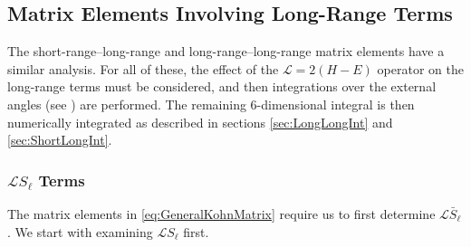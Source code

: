 \documentclass[Dissertation.tex]{subfiles}
\begin{document}
\subsection{Matrix Elements Involving Long-Range Terms}
\label{sec:MatrixLong}
The short-range--long-range and long-range--long-range matrix elements have a similar analysis. For all of these, the effect of the $\mathcal{L} = 2(H-E)$ operator on the long-range terms must be considered, and then integrations over the external angles (see ) are performed. The remaining 6-dimensional integral is then numerically integrated as described in sections \ref{sec:LongLongInt} and \ref{sec:ShortLongInt}.

\subsubsection{\texorpdfstring{$\mathcal{L}S_\ell$}{LS} Terms}
\label{sec:LSTerms}
The matrix elements in \cref{eq:GeneralKohnMatrix} require us to first determine $\mathcal{L}\bar{S}_\ell$. We start with examining $\mathcal{L}S_\ell$ first.
\end{document}
